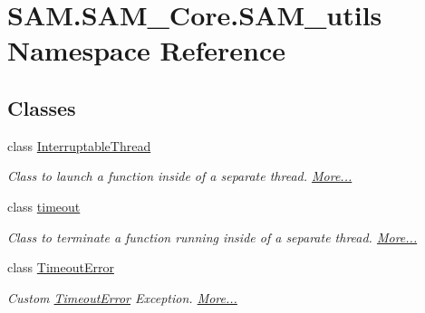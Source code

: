 \hypertarget{namespaceSAM_1_1SAM__Core_1_1SAM__utils}{}\section{S\+A\+M.\+S\+A\+M\+\_\+\+Core.\+S\+A\+M\+\_\+utils Namespace Reference}
\label{namespaceSAM_1_1SAM__Core_1_1SAM__utils}
\subsection*{Classes}
\begin{DoxyCompactItemize}
\item 
class \hyperlink{group__icubclient__SAM__utils_classSAM_1_1SAM__Core_1_1SAM__utils_1_1InterruptableThread}{Interruptable\+Thread}
\begin{DoxyCompactList}\small\item\em Class to launch a function inside of a separate thread.  \hyperlink{group__icubclient__SAM__utils_classSAM_1_1SAM__Core_1_1SAM__utils_1_1InterruptableThread}{More...}\end{DoxyCompactList}\item 
class \hyperlink{group__icubclient__SAM__utils_classSAM_1_1SAM__Core_1_1SAM__utils_1_1timeout}{timeout}
\begin{DoxyCompactList}\small\item\em Class to terminate a function running inside of a separate thread.  \hyperlink{group__icubclient__SAM__utils_classSAM_1_1SAM__Core_1_1SAM__utils_1_1timeout}{More...}\end{DoxyCompactList}\item 
class \hyperlink{group__icubclient__SAM__utils_classSAM_1_1SAM__Core_1_1SAM__utils_1_1TimeoutError}{Timeout\+Error}
\begin{DoxyCompactList}\small\item\em Custom \hyperlink{group__icubclient__SAM__utils_classSAM_1_1SAM__Core_1_1SAM__utils_1_1TimeoutError}{Timeout\+Error} Exception.  \hyperlink{group__icubclient__SAM__utils_classSAM_1_1SAM__Core_1_1SAM__utils_1_1TimeoutError}{More...}\end{DoxyCompactList}\end{DoxyCompactItemize}

